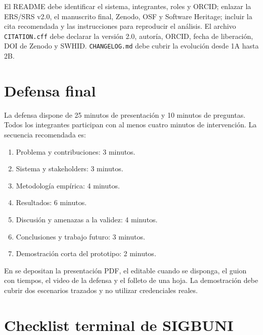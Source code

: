 \documentclass[12pt,journal,onecolumn]{IEEEtran}
\begin{document}
El README debe identificar el sistema, integrantes, roles y ORCID; enlazar la
ERS/SRS v2.0, el manuscrito final, Zenodo, OSF y Software Heritage; incluir la
cita recomendada y las instrucciones para reproducir el análisis. El archivo
\texttt{CITATION.cff} debe declarar la versión 2.0, autoría, ORCID, fecha de
liberación, DOI de Zenodo y SWHID. \texttt{CHANGELOG.md} debe cubrir la
evolución desde 1A hasta 2B.

\section{Defensa final}
\label{sec:defensa2b}

La defensa dispone de 25 minutos de presentación y 10 minutos de preguntas.
Todos los integrantes participan con al menos cuatro minutos de intervención.
La secuencia recomendada es:

\begin{enumerate}
    \item Problema y contribuciones: 3 minutos.
    \item Sistema y stakeholders: 3 minutos.
    \item Metodología empírica: 4 minutos.
    \item Resultados: 6 minutos.
    \item Discusión y amenazas a la validez: 4 minutos.
    \item Conclusiones y trabajo futuro: 3 minutos.
    \item Demostración corta del prototipo: 2 minutos.
\end{enumerate}

En  se depositan la presentación PDF, el editable cuando se
disponga, el guion con tiempos, el video de la defensa y el folleto de una
hoja. La demostración debe cubrir dos escenarios trazados y no utilizar
credenciales reales.

\section{Checklist terminal de SIGBUNI}
\label{sec:checklist2b}
\end{document}
